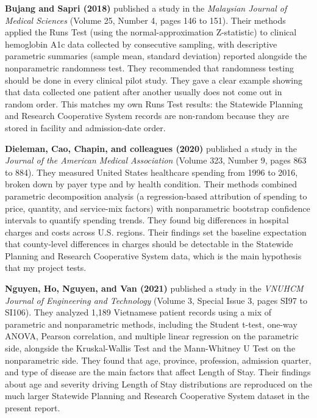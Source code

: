 \documentclass[12pt]{article}
\begin{document}
\textbf{Bujang and Sapri (2018)} published a study in the
\textit{Malaysian Journal of Medical Sciences} (Volume 25, Number 4,
pages 146 to 151). Their methods applied the Runs Test (using the
normal-approximation Z-statistic) to clinical hemoglobin A1c data
collected by consecutive sampling, with descriptive parametric
summaries (sample mean, standard deviation) reported alongside the
nonparametric randomness test. They recommended that randomness
testing should be done in every clinical pilot study. They gave a
clear example showing that data collected one patient after another
usually does not come out in random order. This matches my own Runs
Test results: the Statewide Planning and Research Cooperative System
records are non-random because they are stored in facility and
admission-date order.

\textbf{Dieleman, Cao, Chapin, and colleagues (2020)} published a
study in the \textit{Journal of the American Medical Association}
(Volume 323, Number 9, pages 863 to 884). They measured United States
healthcare spending from 1996 to 2016, broken down by payer type and
by health condition. Their methods combined parametric decomposition
analysis (a regression-based attribution of spending to price,
quantity, and service-mix factors) with nonparametric bootstrap
confidence intervals to quantify spending trends. They found big
differences in hospital charges and costs across U.S. regions. Their
findings set the baseline expectation that county-level differences
in charges should be detectable in the Statewide Planning and
Research Cooperative System data, which is the main hypothesis that
my project tests.

\textbf{Nguyen, Ho, Nguyen, and Van (2021)} published a study in the
\textit{VNUHCM Journal of Engineering and Technology} (Volume 3,
Special Issue 3, pages SI97 to SI106). They analyzed 1,189 Vietnamese
patient records using a mix of parametric and nonparametric methods,
including the Student t-test, one-way ANOVA, Pearson correlation, and
multiple linear regression on the parametric side, alongside the
Kruskal-Wallis Test and the Mann-Whitney U Test on the nonparametric
side. They found that age, province, profession, admission quarter,
and type of disease are the main factors that affect Length of Stay.
Their findings about age and severity driving Length of Stay
distributions are reproduced on the much larger Statewide Planning
and Research Cooperative System dataset in the present report.
\end{document}
